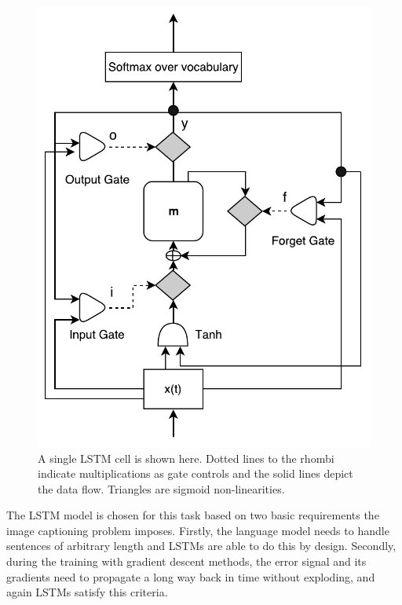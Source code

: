 \begin{figure}[h]
  \begin{center}
    \includegraphics[width=0.5\linewidth]{images/LstmBlockDiag.pdf}
  \end{center}
  \vspace*{-6mm}
  \caption{A single LSTM cell is shown here. Dotted lines
    to the rhombi indicate multiplications as gate controls and the
    solid lines depict the data flow. Triangles are sigmoid
    non-linearities.}
  \label{fig:lstmcell}
\end{figure}

The LSTM model is chosen for this task based on two basic requirements the image
captioning problem imposes. 
Firstly, the language model needs to handle sentences of arbitrary length and
LSTMs are able to do this by design.
Secondly, during the training with gradient descent methods, the error
signal and its gradients need to propagate a long way back in time
without exploding, and again LSTMs satisfy this criteria.

